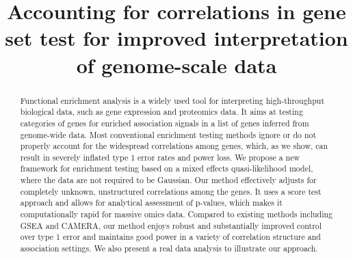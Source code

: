 \documentclass[useAMS,usenatbib, galley]{biom}
\title[This is an Example of Recto Running Head]{Accounting for correlations in gene set test for improved interpretation of genome-scale data}
\begin{document}




\label{firstpage}


\begin{abstract}
Functional enrichment analysis is a widely used tool for interpreting high-throughput biological data, such as gene expression and proteomics data. It aims at testing categories of genes for enriched association signals in a list of genes inferred from genome-wide data. Most conventional enrichment testing methods ignore or do not properly account for the widespread correlations among genes, which, as we show, can result in severely inflated type 1 error rates and power loss. We propose a new framework for enrichment testing based on a mixed effects quasi-likelihood model, where the data are not required to be Gaussian. Our method effectively adjusts for completely unknown, unstructured correlations among the genes. It uses a score test approach and allows for analytical assessment of p-values, which makes it computationally rapid for massive omics data. Compared to existing methods including GSEA and CAMERA, our method enjoys robust and substantially improved control over type 1 error and maintains good power in a variety of correlation structure and association settings. We also present a real data analysis to illustrate our approach.
\end{abstract}

%
%

\begin{keywords}
\end{keywords}

\maketitle
\end{document}
